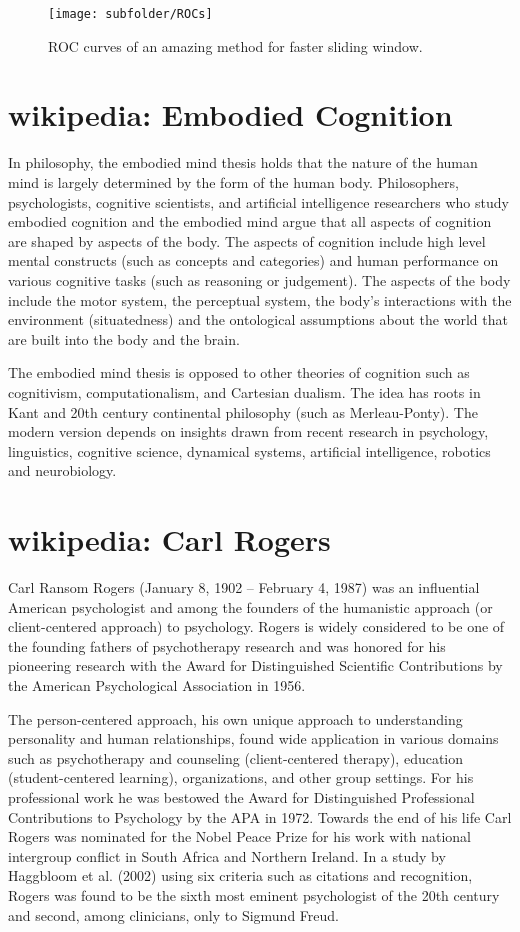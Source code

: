 \begin{figure*}[t]
\begin{center}
\texttt{[image: subfolder/ROCs]}
\end{center}
\caption{
  ROC curves of an amazing method for faster sliding window.
}
\label{fig:epsroc}
\end{figure*}


\section{wikipedia: Embodied Cognition}
\label{sec:embodiement}
In philosophy, the embodied mind thesis holds that the nature of the human mind is largely determined by the form of the human body.
Philosophers, psychologists, cognitive scientists, and artificial intelligence researchers who study embodied cognition and the embodied mind argue that all aspects of cognition are shaped by aspects of the body.
The aspects of cognition include high level mental constructs (such as concepts and categories) and human performance on various cognitive tasks (such as reasoning or judgement).
The aspects of the body include the motor system, the perceptual system, the body's interactions with the environment (situatedness) and the ontological assumptions about the world that are built into the body and the brain.

The embodied mind thesis is opposed to other theories of cognition such as cognitivism, computationalism, and Cartesian dualism.
The idea has roots in Kant and 20th century continental philosophy (such as Merleau-Ponty).
The modern version depends on insights drawn from recent research in psychology, linguistics, cognitive science, dynamical systems, artificial intelligence, robotics and neurobiology.

\section{wikipedia: Carl Rogers}
Carl Ransom Rogers (January 8, 1902 -- February 4, 1987) was an influential American psychologist and among the founders of the humanistic approach (or client-centered approach) to psychology.
Rogers is widely considered to be one of the founding fathers of psychotherapy research and was honored for his pioneering research with the Award for Distinguished Scientific Contributions by the American Psychological Association in 1956.

The person-centered approach, his own unique approach to understanding personality and human relationships, found wide application in various domains such as psychotherapy and counseling (client-centered therapy), education (student-centered learning), organizations, and other group settings.
For his professional work he was bestowed the Award for Distinguished Professional Contributions to Psychology by the APA in 1972.
Towards the end of his life Carl Rogers was nominated for the Nobel Peace Prize for his work with national intergroup conflict in South Africa and Northern Ireland.
In a study by Haggbloom et al. (2002) using six criteria such as citations and recognition, Rogers was found to be the sixth most eminent psychologist of the 20th century and second, among clinicians, only to Sigmund Freud.

